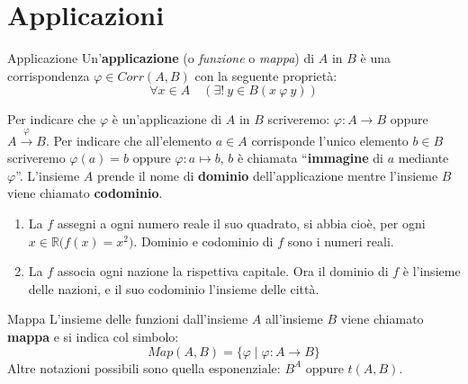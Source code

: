 \section{Applicazioni}

\begin{defbox}{Applicazione}
	Un'\textbf{applicazione} (o \textit{funzione} o \textit{mappa}) di $A$ in $B$ è una corrispondenza $\varphi \in Corr(A,B)$ con la seguente proprietà:
	\begin{equation}\label{eq:applicazione}
		\forall x \in A \quad ( \exists! \ y \in B (x \ \varphi \ y))
	\end{equation}
\end{defbox}

Per indicare che $\varphi$ è un'applicazione di $A$ in $B$ scriveremo: $\varphi: A \rightarrow B$ oppure $ A \stackrel{\varphi}{\rightarrow} B$. Per indicare che all'elemento $a \in A$ corrisponde l'unico elemento $b \in  B$ scriveremo $\varphi(a)=b$ oppure $\varphi:a \mapsto b$, $b$ è chiamata ``\textbf{immagine} di $a$ mediante $\varphi$''. L'insieme $A$ prende il nome di \textbf{dominio} dell'applicazione mentre l'insieme $B$ viene chiamato \textbf{codominio}.

\begin{example}
	\begin{enumerate}
		\item La $f$ assegni a ogni numero reale il suo quadrato, si abbia cioè, per ogni $x \in \mathbb{R} \bigl(f(x)=x^{2}\bigr)$. Dominio e codominio di $f$ sono i numeri reali.
		\item La $f$ associa ogni nazione la rispettiva capitale. Ora il dominio di $f$ è l'insieme delle nazioni, e il suo codominio l'insieme delle città.
	\end{enumerate}
\end{example}

\begin{defbox}{Mappa}
	L'insieme delle funzioni dall'insieme $A$ all'insieme $B$ viene chiamato \textbf{mappa} e si indica col simbolo: $$Map(A,B)= \{ \varphi \; | \; \varphi: A \rightarrow B \}$$ Altre notazioni possibili sono quella esponenziale: $B^{A}$ oppure $t(A,B)$.
\end{defbox}

\begin{center}
\end{center}

